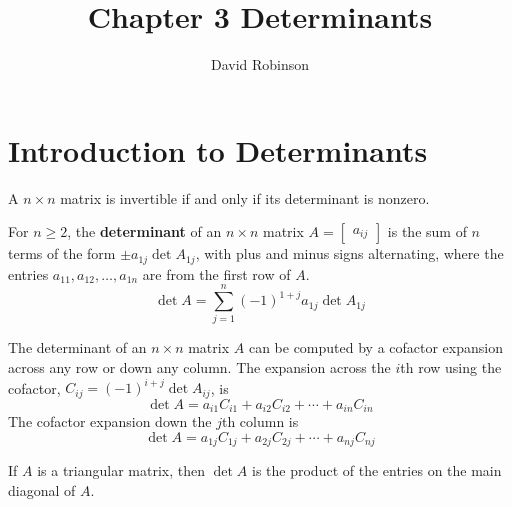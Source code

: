 \documentclass{article}
\title{Chapter 3 Determinants}
\author{David Robinson}
\date{}
\begin{document}
\maketitle

\section*{Introduction to Determinants}
A $n\times n$ matrix is invertible if and only if its determinant is nonzero.

For $n\geq 2$, the \textbf{determinant} of an $n\times n$ matrix $A=\begin{bmatrix}a_{ij}\end{bmatrix}$ is the sum of $n$ terms of the form $\pm a_{1j} \det A_{1j}$, with plus and minus signs alternating, where the entries $a_{11}, a_{12},\ldots , a_{1n}$ are from the first row of $A$.
\[\det A=\sum_{j=1}^{n}{(-1)}^{1+j}a_{1j}\det A_{1j}\]

The determinant of an $n\times n$ matrix $A$ can be computed by a cofactor expansion across any row or down any column. The expansion across the $i$th row using the cofactor, $C_{ij}={(-1)}^{i+j}\det A_{ij}$, is
\[\det A=a_{i1}C_{i1}+a_{i2}C_{i2}+\cdots +a_{in}C_{in}\]
The cofactor expansion down the $j$th column is
\[\det A=a_{1j}C_{1j}+a_{2j}C_{2j}+\cdots +a_{nj}C_{nj}\]

If $A$ is a triangular matrix, then $\det A$ is the product of the entries on the main diagonal of $A$.
\end{document}
